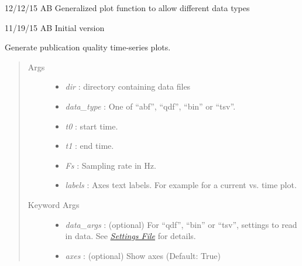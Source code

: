 \documentclass[letterpaper,10pt,english]{sphinxmanual}
\begin{document}
\begin{DUlineblock}{0em}
\item[] 12/12/15        AB      Generalized plot function to allow different data types
\item[] 11/19/15        AB      Initial version
\end{DUlineblock}

\begin{fulllineitems}
\label{api-doc/mosaicscripts:mosaicscripts.plots.timeseries.PlotTimeseries}
Generate publication quality time-series plots.
\begin{quote}\begin{description}
\item[{Args}] \leavevmode\begin{itemize}
\item {} 
\emph{dir} :                       directory containing data files

\item {} 
\emph{data\_type} :         One of ``abf'', ``qdf'', ``bin'' or ``tsv''.

\item {} 
\emph{t0} :                        start time.

\item {} 
\emph{t1} :                        end time.

\item {} 
\emph{Fs} :                        Sampling rate in Hz.

\item {} 
\emph{labels} :            Axes text labels. For example  for a current vs. time plot.

\end{itemize}

\item[{Keyword Args}] \leavevmode\begin{itemize}
\item {} 
\emph{data\_args} :         (optional) For ``qdf'', ``bin'' or ``tsv'', settings to read in data. See {\hyperref[doc/settingsFile:settings\string-page]{\emph{Settings File}}} for details.

\item {} 
\emph{axes} :                      (optional) Show axes (Default: True)


\end{itemize}
\end{description}
\end{quote}
\end{fulllineitems}
\end{document}
